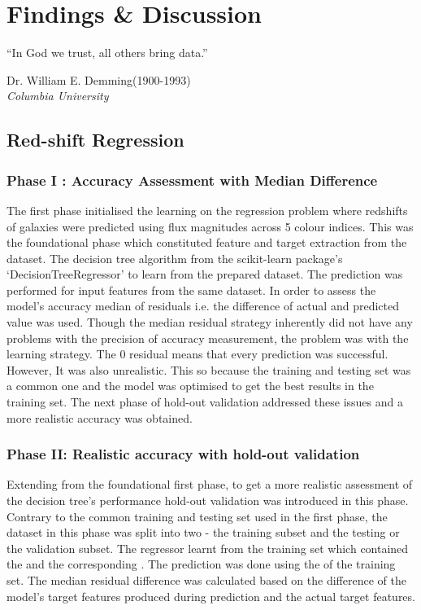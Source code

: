 \section{Findings \& Discussion}

\epigraph{\justify``In God we trust, all others bring data.''}{Dr. William E. Demming(1900-1993)\\\textit{Columbia University}}

\subsection{Red-shift Regression}
\subsubsection{Phase I : Accuracy Assessment with Median Difference \label{rr1}}
The first phase initialised the learning on the regression problem where redshifts of galaxies were predicted using flux magnitudes across 5 colour indices. This was the foundational phase which constituted feature and target extraction from the dataset. The decision tree algorithm from the scikit-learn package's `DecisionTreeRegressor' to learn from the prepared dataset. The prediction was performed for input features from the same dataset. In order to assess the model's accuracy median of residuals i.e. the difference of actual and predicted value was used. Though the median residual strategy inherently did not have any problems with the precision of accuracy measurement, the problem was with the learning strategy. The 0 residual means that every prediction was successful. However, It was also unrealistic. This so because the training and testing set was a common one and the model was optimised to get the best results in the training set. The next phase of hold-out validation addressed these issues and a more realistic accuracy was obtained.

\subsubsection{Phase II: Realistic accuracy with hold-out validation} \label{rr2}
Extending from the foundational first phase, to get a more realistic assessment of the decision tree's performance hold-out validation was introduced in this phase. Contrary to the common training and testing set used in the first phase, the dataset in this phase was split into two - the training subset and the testing or the validation subset. The regressor learnt from the training set which contained the  and the corresponding . The prediction was done using the  of the training set. The median residual difference was calculated based on the difference of the model's target features produced during prediction and the actual target features.

